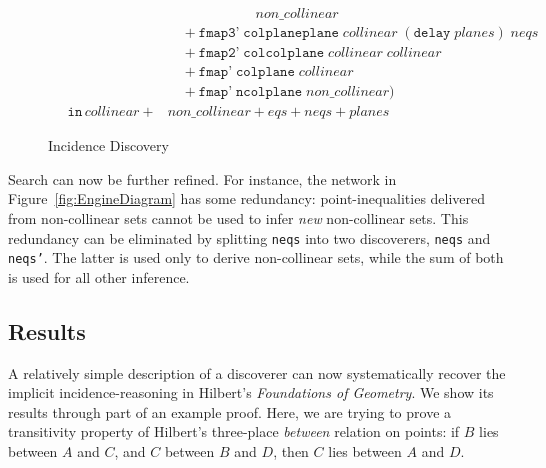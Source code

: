 \begin{figure}
\begin{align*}
&\qquad\qquad\qquad\;non\_collinear\\
&\quad + \texttt{fmap3'}\;\texttt{colplaneplane}\;collinear\;(\texttt{delay}\;planes)\;neqs\\
&\quad+ \texttt{fmap2'}\;\texttt{colcolplane}\;collinear\;collinear\\
&\quad+ \texttt{fmap'}\;\texttt{colplane}\;collinear\\
&\quad+ \texttt{fmap'}\;\texttt{ncolplane}\;non\_collinear)\\
\quad \texttt{in}\,collinear + &non\_collinear + eqs + neqs + planes
\end{align*}
\caption{Incidence Discovery}
\label{fig:Engine}
\end{figure}

Search can now be further refined. For instance, the network in Figure~\ref{fig:EngineDiagram} has some redundancy: point-inequalities delivered from non-collinear sets cannot be used to infer \emph{new} non-collinear sets. This redundancy can be eliminated by splitting \texttt{neqs} into two discoverers, \texttt{neqs} and \texttt{neqs'}. The latter is used only to derive non-collinear sets, while the sum of both is used for all other inference.

\subsection{Results}\label{sec:Results}
A relatively simple description of a discoverer can now systematically recover the implicit incidence-reasoning in Hilbert's \emph{Foundations of Geometry}. We show its results through part of an example proof. Here, we are trying to prove a transitivity property of Hilbert's three-place \emph{between} relation on points: if $B$ lies between $A$ and $C$, and $C$ between $B$ and $D$, then $C$ lies between $A$ and $D$.

